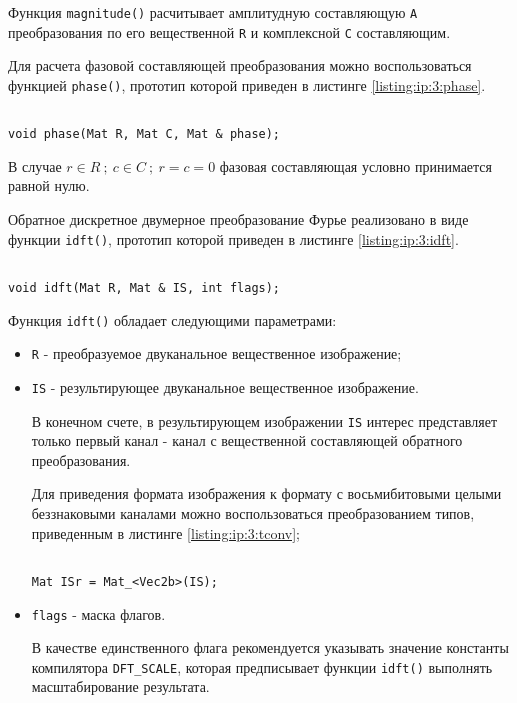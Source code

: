 Функция \verb|magnitude()| расчитывает амплитудную составляющую \verb|A| преобразования по его вещественной \verb|R| и комплексной \verb|C| составляющим.

Для расчета фазовой составляющей преобразования можно воспользоваться функцией \verb|phase()|, прототип которой приведен в листинге \ref{listing:ip:3:phase}.

\begin{lstlisting}

void phase(Mat R, Mat C, Mat & phase);

\end{lstlisting}
\mylistingend

В случае $r \in R ~;~ c \in C ~;~ r = c = 0$ фазовая составляющая условно принимается равной нулю.

Обратное дискретное двумерное преобразование Фурье реализовано в виде функции \verb|idft()|, прототип которой приведен в листинге \ref{listing:ip:3:idft}.

\begin{lstlisting}

void idft(Mat R, Mat & IS, int flags);

\end{lstlisting}
\mylistingend

Функция \verb|idft()| обладает следующими параметрами:

\begin{itemize}

	\item \verb|R| - преобразуемое двуканальное вещественное изображение;
	\item \verb|IS| - результирующее двуканальное вещественное изображение.

	В конечном счете, в результирующем изображении \verb|IS| интерес представляет только первый канал - канал с вещественной составляющей обратного преобразования.
	
	Для приведения формата изображения к формату с восьмибитовыми целыми беззнаковыми каналами можно воспользоваться преобразованием типов, приведенным в листинге \ref{listing:ip:3:tconv};

\begin{lstlisting}

Mat ISr = Mat_<Vec2b>(IS);

\end{lstlisting}
\mylistingend

	\item \verb|flags| - маска флагов.

	В качестве единственного флага рекомендуется указывать значение константы компилятора \verb|DFT_SCALE|, которая предписывает функции \verb|idft()| выполнять масштабирование результата.

\end{itemize}

